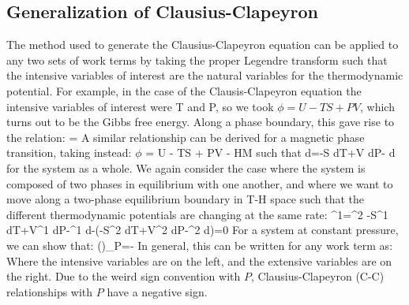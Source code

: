 \documentclass[12pt]{article}
\begin{document}
\subsection{Generalization of Clausius-Clapeyron}
The method used to generate the Clausius-Clapeyron equation can be applied to any two sets of work terms by taking the proper Legendre transform such
that the intensive variables of interest are the natural variables for the thermodynamic potential. For example, in the case of the Clausis-Clapeyron
equation the intensive variables of interest were T and P, so we took $\phi  = U-TS+PV$, which turns out to be the Gibbs free energy. Along a phase boundary, this gave rise to the relation:
\eqs
{}=
\eqe
A similar relationship can be derived for a magnetic phase transition, taking
instead: $\phi $ = U - TS + PV - HM such that
\eqs 
d\phi =-S dT+V dP- d
\eqe
for the system as a whole. We again consider the case where the system is composed of two phases in equilibrium with one another, and where we want to move along a two-phase equilibrium boundary in T-H space such that the different thermodynamic potentials are changing at the same rate:
\eqs{}^1=^2\eqe
\eqs
-S^1 dT+V^1 dP-^1 d-\left(-S^2 dT+V^2 dP-^2 d\right)=0
\eqe
For a system at constant pressure, we
can show that:
\eqs\left(\right)_P=-\eqe
In general, this can be written for any work term as:
\eqs {}\eqe
Where the intensive variables are on the left, and the extensive variables are on the right. Due to the weird sign convention with $P$, Clausius-Clapeyron (C-C) relationships with $P$ have a negative sign.
\end{document}
